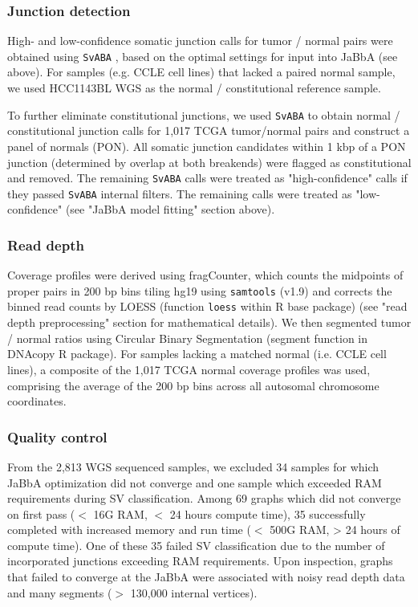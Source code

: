 \documentclass[phd,tocprelim]{cornell}
\begin{document}
\subsubsection*{Junction detection}

High- and low-confidence somatic junction calls for tumor / normal pairs were obtained using \texttt{SvABA} \cite{wala2018}, based on the optimal settings for input into JaBbA (see above). For samples (e.g. CCLE cell lines) that lacked a paired normal sample, we used HCC1143BL WGS as the normal / constitutional reference sample.

To further eliminate constitutional junctions, we used \texttt{SvABA} to obtain normal / constitutional junction calls for 1,017 TCGA tumor/normal pairs and construct a panel of normals (PON).  All somatic junction candidates within 1 kbp of a PON junction (determined by overlap at both breakends) were flagged as constitutional and removed.  The remaining \texttt{SvABA} calls were treated as "high-confidence" calls if they passed \texttt{SvABA} internal filters.  The remaining calls were treated as "low-confidence" (see "JaBbA model fitting" section above).

\subsubsection*{Read depth} \label{meth:readDepth}
Coverage profiles were derived using fragCounter, which counts the midpoints of proper pairs in 200 bp bins tiling hg19 using \texttt{samtools} (v1.9) and corrects the binned read counts by LOESS (function \texttt{loess} within R base package) (see "read depth preprocessing" section for mathematical details). We then segmented tumor / normal ratios using Circular Binary Segmentation \cite{olshen2004} (segment function in DNAcopy R package). For samples lacking a matched normal (i.e. CCLE cell lines), a composite of the 1,017 TCGA normal coverage profiles was used, comprising the average of the 200 bp bins across all autosomal chromosome coordinates.

\subsubsection*{Quality control}
From the 2,813 WGS sequenced samples, we excluded 34 samples for which JaBbA optimization did not converge and one sample which exceeded RAM requirements during SV classification. Among 69 graphs which did not converge on first pass ($<$ 16G RAM, $<$ 24 hours compute time), 35 successfully completed with increased memory and run time ($<$ 500G RAM, > 24 hours of compute time).  One of these 35 failed SV classification due to the number of incorporated junctions exceeding RAM requirements.  Upon inspection, graphs that failed to converge at the JaBbA were associated with noisy read depth data and many segments ($>$ 130,000 internal vertices).
\end{document}
